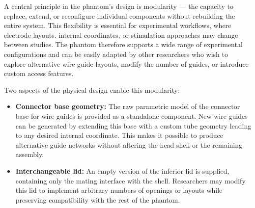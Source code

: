 
A central principle in the phantom’s design is modularity — the capacity to replace, extend, or reconfigure individual components without rebuilding the entire system. This flexibility is essential for experimental workflows, where electrode layouts, internal coordinates, or stimulation approaches may change between studies. The phantom therefore supports a wide range of experimental configurations and can be easily adapted by other researchers who wish to explore alternative wire-guide layouts, modify the number of guides, or introduce custom access features.

Two aspects of the physical design enable this modularity:

\begin{itemize}
    \item \textbf{Connector base geometry:}  
    The raw parametric model of the connector base for wire guides is provided as a standalone component. New wire guides can be generated by extending this base with a custom tube geometry leading to any desired internal coordinate. This makes it possible to produce alternative guide networks without altering the head shell or the remaining assembly.

    \item \textbf{Interchangeable lid:}  
    An empty version of the inferior lid is supplied, containing only the mating interface with the shell. Researchers may modify this lid to implement arbitrary numbers of openings or layouts while preserving compatibility with the rest of the phantom.
\end{itemize}
